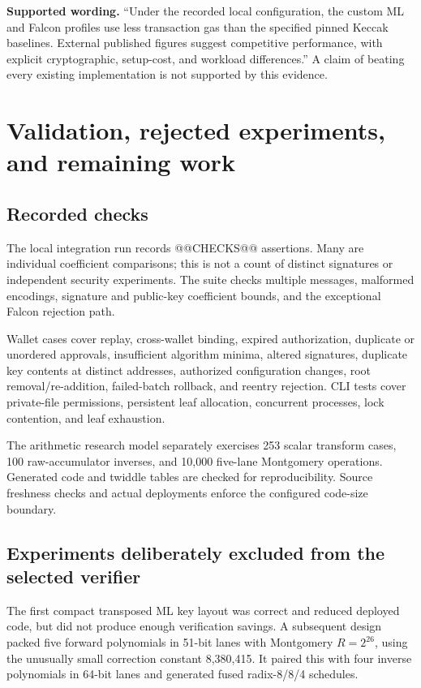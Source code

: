 \documentclass[11pt,a4paper]{article}
\newcommand{\callout}[1]{\par\smallskip\noindent\colorbox{pale}{\parbox{\dimexpr\linewidth-2\fboxsep\relax}{\small #1}}\par\smallskip}
\begin{document}
\callout{\textbf{Supported wording.} ``Under the recorded local configuration,
the custom ML and Falcon profiles use less transaction gas than the specified
pinned Keccak baselines. External published figures suggest competitive
performance, with explicit cryptographic, setup-cost, and workload
differences.'' A claim of beating every existing implementation is not
supported by this evidence.}

\newpage
\section{Validation, rejected experiments, and remaining work}
\subsection{Recorded checks}
The local integration run records @@CHECKS@@ assertions. Many are individual
coefficient comparisons; this is not a count of distinct signatures or
independent security experiments. The suite checks multiple messages,
malformed encodings, signature and public-key coefficient bounds, and the
exceptional Falcon rejection path.

Wallet cases cover replay, cross-wallet binding, expired authorization,
duplicate or unordered approvals, insufficient algorithm minima, altered
signatures, duplicate key contents at distinct addresses, authorized
configuration changes, root removal/re-addition, failed-batch rollback, and
reentry rejection. CLI tests cover private-file permissions, persistent leaf
allocation, concurrent processes, lock contention, and leaf exhaustion.

The arithmetic research model separately exercises 253 scalar transform
cases, 100 raw-accumulator inverses, and 10,000 five-lane Montgomery operations.
Generated code and twiddle tables are checked for reproducibility. Source
freshness checks and actual deployments enforce the configured code-size
boundary.

\subsection{Experiments deliberately excluded from the selected verifier}
The first compact transposed ML key layout was correct and reduced deployed
code, but did not produce enough verification savings. A subsequent design
packed five forward polynomials in 51-bit lanes with Montgomery
$R=2^{26}$, using the unusually small correction constant 8,380,415. It paired
this with four inverse polynomials in 64-bit lanes and generated fused
radix-8/8/4 schedules.
\end{document}
